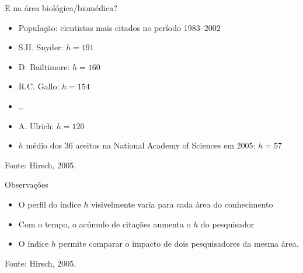 \documentclass{beamer}
\begin{document}



\begin{frame}{E na área biológica/biomédica?}
  \begin{itemize}
  \item População: cientistas mais citados no período 1983--2002
  \item<1-> S.H. Snyder: $h=191$
  \item<1-> D. Bailtimore: $h=160$
  \item<1-> R.C. Gallo: $h=154$
  \item<1-> \ldots
  \item<1-> A. Ulrich: $h=120$
  \item<2-> $h$ médio dos 36 aceitos na National Academy of Sciences em 2005: $h=57$
  \end{itemize}

\vfill
Fonte: Hirsch, 2005.
\end{frame}

\begin{frame}{Observações}
  \begin{itemize}
  \item O perfil do índice $h$ visivelmente varia para cada área do conhecimento
  \item Com o tempo, o acúmulo de citações aumenta o $h$ do pesquisador
  \item O índice $h$ permite comparar o impacto de dois pesquisadores da mesma área.
  \end{itemize}

\vfill
Fonte: Hirsch, 2005.
\end{frame}


\end{document}
